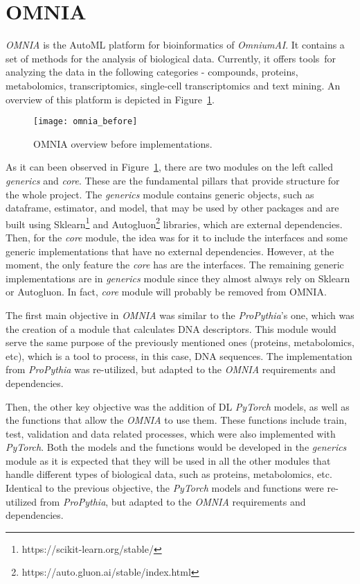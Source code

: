\section{OMNIA}

\textit{OMNIA} is the \gls{AutoML} platform for bioinformatics of \textit{OmniumAI}. It contains a set of methods for the analysis of biological data. Currently, it offers tools for analyzing the data in the following categories - compounds, proteins, metabolomics, transcriptomics, single-cell transcriptomics and text mining. An overview of this platform is depicted in Figure~\ref{fig:omnia_before}.

\begin{figure}[htbp]
    \centering
    \texttt{[image: omnia\_before]}
    \caption{OMNIA overview before implementations.}
    \label{fig:omnia_before}
\end{figure}

As it can been observed in Figure~\ref{fig:omnia_before}, there are two modules on the left called \textit{generics} and \textit{core}. These are the fundamental pillars that provide structure for the whole project. The \textit{generics} module contains generic objects, such as dataframe, estimator, and model, that may be used by other packages and are built using Sklearn\footnote{https://scikit-learn.org/stable/} and Autogluon\footnote{https://auto.gluon.ai/stable/index.html} libraries, which are external dependencies. Then, for the \textit{core} module, the idea was for it to include the interfaces and some generic implementations that have no external dependencies. However, at the moment, the only feature the \textit{core} has are the interfaces. The remaining generic implementations are in \textit{generics} module since they almost always rely on Sklearn or Autogluon. In fact, \textit{core} module will probably be removed from OMNIA.

The first main objective in \textit{OMNIA} was similar to the \textit{ProPythia}'s one, which was the creation of a module that calculates \gls{DNA} descriptors. This module would serve the same purpose of the previously mentioned ones (proteins, metabolomics, etc), which is a tool to process, in this case, \gls{DNA} sequences. The implementation from \textit{ProPythia} was re-utilized, but adapted to the \textit{OMNIA} requirements and dependencies.

Then, the other key objective was the addition of \gls{DL} \textit{PyTorch} models, as well as the functions that allow the \textit{OMNIA} to use them. These functions include train, test, validation and data related processes, which were also implemented with \textit{PyTorch}. Both the models and the functions would be developed in the \textit{generics} module as it is expected that they will be used in all the other modules that handle different types of biological data, such as proteins, metabolomics, etc. Identical to the previous objective, the \textit{PyTorch} models and functions were re-utilized from \textit{ProPythia}, but adapted to the \textit{OMNIA} requirements and dependencies.

